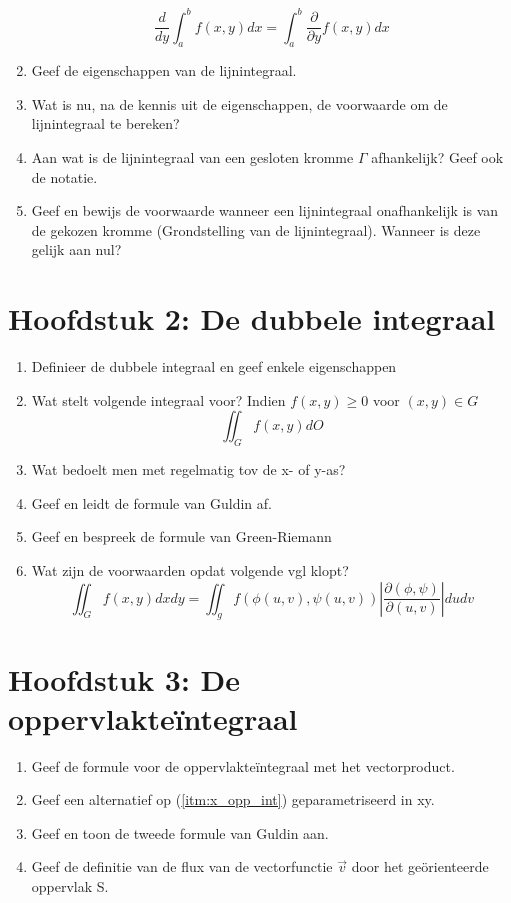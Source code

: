 \documentclass[12pt]{article}
\begin{document}
\begin{enumerate}
            $$ \frac{d}{dy}\int_a^b f(x,y)dx = \int_a^b \frac{\partial}{\partial y}f(x, y)dx $$
        \item Geef de eigenschappen van de lijnintegraal.
        \item Wat is nu, na de kennis uit de eigenschappen, de voorwaarde om de lijnintegraal te bereken?
        \item Aan wat is de lijnintegraal van een gesloten kromme $\Gamma$ afhankelijk? Geef ook de notatie.
        \item Geef en bewijs de voorwaarde wanneer een lijnintegraal onafhankelijk is van de gekozen kromme (Grondstelling van de lijnintegraal). Wanneer is deze gelijk aan nul?
    \end{enumerate}

    \section*{Hoofdstuk 2: De dubbele integraal}
    \begin{enumerate}
        \item Definieer de dubbele integraal en geef enkele eigenschappen
        \item Wat stelt volgende integraal voor? Indien $f(x,y) \geq 0$ voor $(x,y) \in G$
            $$ \iint_G f(x,y)dO $$
        \item Wat bedoelt men met regelmatig tov de x- of y-as?
        \item Geef en leidt de formule van Guldin af.
        \item Geef en bespreek de formule van Green-Riemann
        \item Wat zijn de voorwaarden opdat volgende vgl klopt?
            $$ \iint_G f(x,y)dxdy = \iint_g f(\phi(u,v), \psi(u,v)) \left|\frac{\partial(\phi, \psi)}{\partial(u,v)}\right| dudv $$
    \end{enumerate}

    \section*{Hoofdstuk 3: De oppervlakte\"integraal}
    \begin{enumerate}
        \item \label{itm:x_opp_int} Geef de formule voor de oppervlakte\"integraal met het vectorproduct.
        \item Geef een alternatief op (\ref{itm:x_opp_int}) geparametriseerd in xy.
        \item Geef en toon de tweede formule van Guldin aan.
        \item Geef de definitie van de flux van de vectorfunctie $\vec{v}$ door het ge\"orienteerde oppervlak S.
    \end{enumerate}
\end{document}
